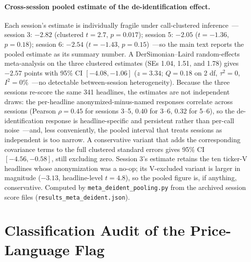 \paragraph{Cross-session pooled estimate of the de-identification effect.} Each session's estimate is individually fragile under call-clustered inference~---session 3: $-2.82$ (clustered $t=2.7$, $p=0.017$); session 5: $-2.05$ ($t=-1.36$, $p=0.18$); session 6: $-2.54$ ($t=-1.43$, $p=0.15$)~---so the main text reports the pooled estimate as its summary number. A DerSimonian--Laird random-effects meta-analysis on the three clustered estimates (SEs 1.04, 1.51, and 1.78) gives $-2.57$ points with 95\% CI $[-4.08, -1.06]$ ($z=3.34$; $Q=0.18$ on 2 df, $\tau^2=0$, $I^2=0\%$~---no detectable between-session heterogeneity). Because the three sessions re-score the same 341 headlines, the estimates are not independent draws: the per-headline anonymized-minus-named responses correlate across sessions (Pearson $\rho=0.45$ for sessions 3--5, $0.40$ for 3--6, $0.32$ for 5--6), so the de-identification response is headline-specific and persistent rather than per-call noise~---and, less conveniently, the pooled interval that treats sessions as independent is too narrow. A conservative variant that adds the corresponding covariance terms to the full clustered standard errors gives 95\% CI $[-4.56, -0.58]$, still excluding zero. Session 3's estimate retains the ten ticker-V headlines whose anonymization was a no-op; its V-excluded variant is larger in magnitude ($-3.13$, headline-level $t=4.8$), so the pooled figure is, if anything, conservative. Computed by \texttt{meta\_deident\_pooling.py} from the archived session score files (\texttt{results\_meta\_deident.json}).


\section{Classification Audit of the Price-Language Flag}\label{app:classification}


